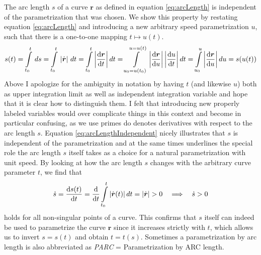 \documentclass[11pt, DINA4, fleqn]{amsart}
\def\df{\mathrm{d}\xspace}
\newcommand{\dd}[2]{\frac{\df#1}{\df#2}}
\def\vr{\boldsymbol{r}\xspace}
\def\vrd{\dot{\vr}\xspace}
\begin{document}
The arc length $s$ of a curve $\vr$ as defined in equation \eqref{eq:arcLength} 
is independent of the parametrization that was chosen. We
show this property by restating equation \eqref{eq:arcLength} and introducing
a new arbitrary speed parametrization $u$, such that there is a one-to-one mapping
$t\mapsto u(t)$.
\begin{align}
s(t) = \int\displaylimits_{t_0}^{t} \, ds = \int\displaylimits_{t_0}^{t} \,
|\vrd| \,\, dt = 
\int\displaylimits_{t_0}^{t} \left|\dd{\vr}{t}\right| dt
= \int\displaylimits_{u_0 = u(t_0)}^{u=u(t)} \left|\dd{\vr}{u}\right|\left|\dd{u}{t}\right| dt
= \int\displaylimits_{u_0}^{u} \left|\dd{\vr}{u}\right| du
= s(u(t))
\label{eq:arcLengthIndependent}
\end{align}
Above I apologize for the ambiguity in notation by having $t$ (and likewise $u$) both as upper integration limit as well as independent integration variable and hope that it is clear how to distinguish them. I felt that introducing new properly labeled variables would over complicate things in this context and become in particular confusing, as we use primes do denotes derivatives with respect to the arc length $s$. 
Equation \eqref{eq:arcLengthIndependent} nicely illustrates that $s$ is independent of the parametrization and at the same times underlines the special role the arc length $s$ itself takes as a choice for a natural parametrization with unit speed.
By looking at how the arc length $s$ changes with the arbitrary curve parameter $t$, we find that
\begin{align}
\dot{s} = \dd{s(t)}{t} = \dd{}{t} \int\displaylimits_{t_0}^{t} |\vrd(t)|\,  dt = |\vrd| > 0 \quad \Longrightarrow \quad \dot{s}>0
\end{align}
holds for all non-singular points of a curve. This confirms that $s$ itself can indeed be used to parametrize the curve $\vr$ since it increases strictly with $t$, which allows us to invert $s = s(t)$ and obtain $t = t(s)$.
Sometimes a parametrization by arc length is also abbreviated as \emph{PARC} = Parametrization by ARC length.
\end{document}
